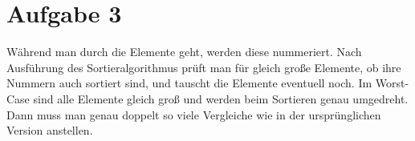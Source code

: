 \documentclass{article}
\begin{document}
\section{Aufgabe 3}
Während man durch die Elemente geht, werden diese nummeriert. Nach 
Ausführung des Sortieralgorithmus prüft man für gleich große Elemente,
ob ihre Nummern auch sortiert sind, und tauscht die Elemente eventuell 
noch.
Im Worst-Case sind alle Elemente gleich groß und werden beim Sortieren
genau umgedreht. Dann muss man genau doppelt so viele Vergleiche  wie in
der ursprünglichen Version anstellen.  
\end{document}
